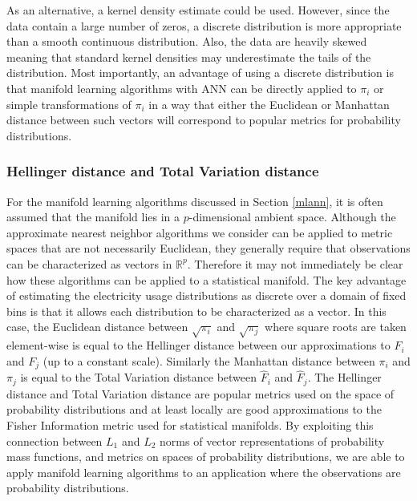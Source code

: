 \documentclass[11pt,a4paper,]{article}
\begin{document}
As an alternative, a kernel density estimate could be used. However, since the data contain a large number of zeros, a discrete distribution is more appropriate than a smooth continuous distribution. Also, the data are heavily skewed meaning that standard kernel densities may underestimate the tails of the distribution. Most importantly, an advantage of using a discrete distribution is that manifold learning algorithms with ANN can be directly applied to \(\pi_i\) or simple transformations of \(\pi_i\) in a way that either the Euclidean or Manhattan distance between such vectors will correspond to popular metrics for probability distributions.

\hypertarget{hellinger-distance-and-total-variation-distance}{%
\subsubsection*{Hellinger distance and Total Variation distance}\label{hellinger-distance-and-total-variation-distance}}

For the manifold learning algorithms discussed in Section \ref{mlann}, it is often assumed that the manifold lies in a \(p\)-dimensional ambient space. Although the approximate nearest neighbor algorithms we consider can be applied to metric spaces that are not necessarily Euclidean, they generally require that observations can be characterized as vectors in \(\mathbb{R}^p\). Therefore it may not immediately be clear how these algorithms can be applied to a statistical manifold. The key advantage of estimating the electricity usage distributions as discrete over a domain of fixed bins is that it allows each distribution to be characterized as a vector. In this case, the Euclidean distance between \(\sqrt{\pi_{i}}\) and \(\sqrt{\pi_{j}}\) where square roots are taken element-wise is equal to the Hellinger distance between our approximations to \(F_{i}\) and \(F_{j}\) (up to a constant scale). Similarly the Manhattan distance between \(\pi_{i}\) and \(\pi_{j}\) is equal to the Total Variation distance between \(\hat{F}_{i}\) and \(\hat{F}_{j}\). The Hellinger distance and Total Variation distance are popular metrics used on the space of probability distributions \autocite{Hellinger_undated-rs,LeCam1973-da} and at least locally are good approximations to the Fisher Information metric used for statistical manifolds. By exploiting this connection between \(L_1\) and \(L_2\) norms of vector representations of probability mass functions, and metrics on spaces of probability distributions, we are able to apply manifold learning algorithms to an application where the observations are probability distributions.
\end{document}
